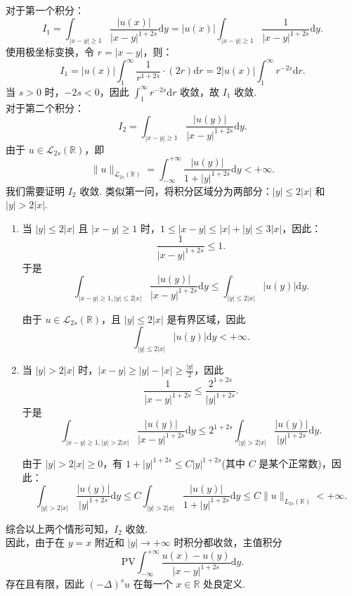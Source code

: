 \begin{solution}
\begin{enumerate}
\[        \]
        对于第一个积分：
        \[
        I_1 = \int_{|x-y|\geq 1} \frac{|u(x)|}{|x-y|^{1+2s}} \mathrm{d}y = |u(x)| \int_{|x-y|\geq 1} \frac{1}{|x-y|^{1+2s}} \mathrm{d}y.
        \]
        使用极坐标变换，令 $r = |x-y|$，则：
        \[
        I_1 = |u(x)| \int_{1}^{\infty} \frac{1}{r^{1+2s}} \cdot (2r) \mathrm{d}r = 2|u(x)| \int_{1}^{\infty} r^{-2s} \mathrm{d}r.
        \]
        当 $s > 0$ 时，$-2s < 0$，因此 $\displaystyle \int_{1}^{\infty} r^{-2s} \mathrm{d}r$ 收敛，故 $I_1$ 收敛.\\
        对于第二个积分：
        \[
        I_2 = \int_{|x-y|\geq 1} \frac{|u(y)|}{|x-y|^{1+2s}} \mathrm{d}y.
        \]
        由于 $u \in \mathcal{L}_{2s}(\mathbb{R})$，即
        \[
        \|u\|_{\mathcal{L}_{2s}(\mathbb{R})} = \int_{-\infty}^{+\infty} \frac{|u(y)|}{1 + |y|^{1+2s}} \mathrm{d}y <+\infty.
        \]
        我们需要证明 $I_2$ 收敛. 类似第一问，将积分区域分为两部分：$|y| \leq 2|x|$ 和 $|y| > 2|x|$.\\
        \begin{enumerate}
        \item[i.]当 $|y| \leq 2|x|$ 且 $|x-y| \geq 1$ 时，$1\leq|x-y| \leq |x| + |y| \leq 3|x|$，因此：
        \[
        \frac{1}{|x-y|^{1+2s}} \leq 1.
        \]
        于是
        \[
        \int_{|x-y|\geq 1, |y| \leq 2|x|} \frac{|u(y)|}{|x-y|^{1+2s}} \mathrm{d}y \leq \int_{|y| \leq 2|x|} |u(y)| \mathrm{d}y.
        \]

        由于 $u \in \mathcal{L}_{2s}(\mathbb{R})$，且 $|y| \leq 2|x|$ 是有界区域，因此
        \[
        \int_{|y| \leq 2|x|} |u(y)| \mathrm{d}y < +\infty.
        \]

        \item[ii.]当 $|y| > 2|x|$ 时，$\displaystyle |x-y| \geq |y| - |x| \geq \frac{|y|}{2}$，因此
        \[
        \frac{1}{|x-y|^{1+2s}} \leq \frac{2^{1+2s}}{|y|^{1+2s}}.
        \]
        于是
        \[
        \int_{|x-y|\geq 1, |y| > 2|x|} \frac{|u(y)|}{|x-y|^{1+2s}} \mathrm{d}y \leq 2^{1+2s} \int_{|y| > 2|x|} \frac{|u(y)|}{|y|^{1+2s}} \mathrm{d}y.
        \]

        由于 $|y| > 2|x| \geq 0$，有 $1 + |y|^{1+2s} \leq C |y|^{1+2s}$(其中 $C$ 是某个正常数)，因此：
        \[
        \int_{|y| > 2|x|} \frac{|u(y)|}{|y|^{1+2s}} \mathrm{d}y \leq C \int_{|y| > 2|x|} \frac{|u(y)|}{1 + |y|^{1+2s}} \mathrm{d}y \leq C \|u\|_{L_{2s}(\mathbb{R})} < +\infty.
        \]    
        \end{enumerate}
        综合以上两个情形可知，$I_2$ 收敛.\\
        因此，由于在 $y = x$ 附近和 $|y| \to +\infty$ 时积分都收敛，主值积分 
        \[
        \mathrm{PV} \int_{-\infty}^{+\infty} \frac{u(x) - u(y)}{|x-y|^{1+2s}} \mathrm{d}y.
        \]
        存在且有限，因此 $(-\Delta)^s u$ 在每一个 $x \in \mathbb{R}$ 处良定义. 
        

\end{enumerate}
\end{solution}
